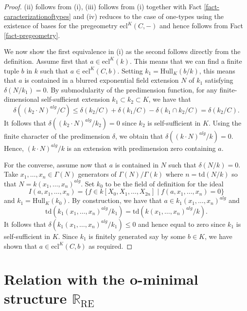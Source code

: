 \documentclass[12pt]{amsart}
\theoremstyle{definition}
\theoremstyle{plain}
\theoremstyle{exampstyle}\newtheorem{thmx}{Theorem}
\theoremstyle{exampstyle}\newtheorem{thmxbis}{Theorem}
\begin{document}
\begin{proof}
(ii) follows from (i), (iii) follows from (i) together with Fact \ref{fact-caracterizationoftypes} and (iv) reduces to the case of one-types using the existence of bases for the pregeometry $\mathrm{ecl}^K(C,-)$ and hence follows from Fact \ref{fact-pregeometry}.  

We now show the first equivalence in (i) as the second follows directly from the definition. Assume first that $a \in \mathrm{ecl}^K(k)$. This means that we can find a finite tuple $b$ in $k$ such that $a \in \mathrm{ecl}^K(C,b)$. Setting $k_1 = \mathrm{Hull}_K(b/k)$, this means that $a$ is contained in a blurred exponential field extension $N$ of $k_1$ satisfying $\delta(N/k_1) = 0$.
By submodularity of the predimension function, for any finite-dimensional self-sufficient extension $k_1 \subset k_2 \subset K$, we have that 
$$\delta((k_2 \cdot N)^{alg}/C) \leq \delta(k_2/C) + \delta(k_1/C) - \delta(k_1 \cap k_2/C) = \delta(k_2/C).$$  
It follows that $\delta((k_2 \cdot N)^{alg}/k_2) = 0$ since $k_2$ is self-sufficient in $K$. Using the finite character of the predimension $\delta$, we obtain that $\delta((k \cdot N)^{alg}/k) = 0$. Hence, $(k \cdot N)^{alg}/k$ is an extension with predimension zero containing $a$. 

For the converse, assume now that $a$ is contained in $N$ such that $\delta(N/k) = 0$. Take $x_1,\ldots,x_n \in \Gamma(N)$ generators of $\Gamma(N)/\Gamma(k)$ where $n = \mathrm{td}(N/k)$ so that $N = k(x_1,\ldots,x_n)^{alg}$. Set $k_0$ to be the field of definition for the ideal 
$$ I(a,x_1,\ldots,x_n)  = \lbrace f \in k[X_0,X_1,\ldots,X_{2n}] \mid f(a,x_1,\ldots, x_n) = 0 \rbrace$$
and $k_1 = \mathrm{Hull}_K(k_0)$. By construction, we have that $a \in k_1(x_1,\ldots,x_n)^{alg}$ and $$\mathrm{td}(k_1(x_1,\ldots,x_n)^{alg}/k_1) = \mathrm{td}(k(x_1,\ldots,x_n)^{alg}/k).$$
It follows that $\delta(k_1(x_1,\ldots,x_n)^{alg}/k_1) \leq 0$ and hence equal to zero since $k_1$ is self-sufficient in $K$. Since $k_1$ is finitely generated say by some $b \in K$, we have shown that $a \in \mathrm{ecl}^K(C,b)$ as required.
\end{proof}



\section{Relation with the o-minimal structure $\mathbb{R}_{\mathrm{RE}}$}
\end{document}
